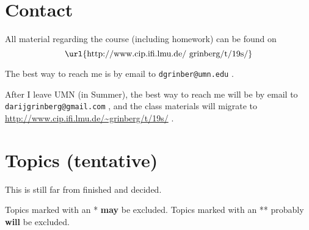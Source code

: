 \documentclass[numbers=enddot,12pt,final,onecolumn,notitlepage]{scrartcl}%
\theoremstyle{definition}
\begin{document}
\section{Contact}

All material regarding the course (including homework) can be found on
\[
\text{\url{http://www.cip.ifi.lmu.de/~grinberg/t/19s/}}
\]


The best way to reach me is by email to \texttt{dgrinber@umn.edu} .

After I leave UMN (in Summer), the best way to reach me will be by email to
\texttt{darijgrinberg@gmail.com} , and the class materials will migrate to
\url{http://www.cip.ifi.lmu.de/~grinberg/t/19s/} .

\section{Topics (tentative)}

This is still far from finished and decided.

Topics marked with an * \textbf{may} be excluded. Topics marked with an **
probably \textbf{will} be excluded.
\end{document}
